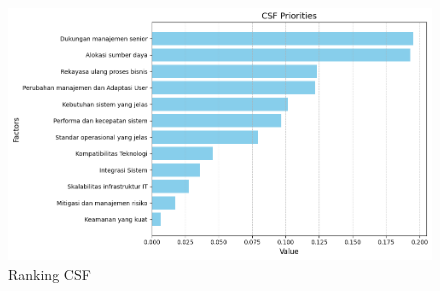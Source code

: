 \documentclass[journal,article,submit,pdftex,moreauthors]{Definitions/mdpi}
\begin{document}


\begin{figure}[H]
\includegraphics[width=\textwidth]{attachments/fuzzy_priorities.png}
\caption{Ranking CSF \label{fig:ranking-csf}}
\end{figure}   
\end{document}
